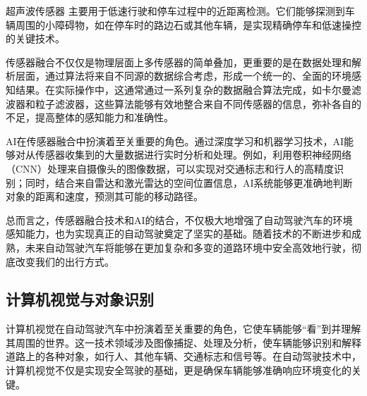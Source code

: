 超声波传感器 主要用于低速行驶和停车过程中的近距离检测。它们能够探测到车辆周围的小障碍物，如在停车时的路边石或其他车辆，是实现精确停车和低速操控的关键技术。

传感器融合不仅仅是物理层面上多传感器的简单叠加，更重要的是在数据处理和解析层面，通过算法将来自不同源的数据综合考虑，形成一个统一的、全面的环境感知结果。在实际操作中，这通常通过一系列复杂的数据融合算法完成，如卡尔曼滤波器和粒子滤波器，这些算法能够有效地整合来自不同传感器的信息，弥补各自的不足，提高整体的感知能力和准确性。

AI在传感器融合中扮演着至关重要的角色。通过深度学习和机器学习技术，AI能够对从传感器收集到的大量数据进行实时分析和处理。例如，利用卷积神经网络（CNN）处理来自摄像头的图像数据，可以实现对交通标志和行人的高精度识别；同时，结合来自雷达和激光雷达的空间位置信息，AI系统能够更准确地判断对象的距离和速度，预测其可能的移动路径。

总而言之，传感器融合技术和AI的结合，不仅极大地增强了自动驾驶汽车的环境感知能力，也为实现真正的自动驾驶奠定了坚实的基础。随着技术的不断进步和成熟，未来自动驾驶汽车将能够在更加复杂和多变的道路环境中安全高效地行驶，彻底改变我们的出行方式。

\subsection{计算机视觉与对象识别}
计算机视觉在自动驾驶汽车中扮演着至关重要的角色，它使车辆能够“看”到并理解其周围的世界。这一技术领域涉及图像捕捉、处理及分析，使车辆能够识别和解释道路上的各种对象，如行人、其他车辆、交通标志和信号等。在自动驾驶技术中，计算机视觉不仅是实现安全驾驶的基础，更是确保车辆能够准确响应环境变化的关键。

